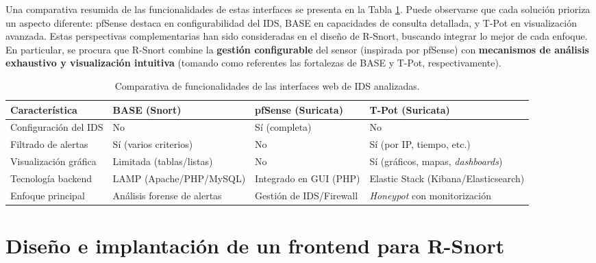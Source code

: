 \documentclass[11pt,a4paper,twoside]{report}
\begin{document}
\vspace{1em}
\noindent Una comparativa resumida de las funcionalidades de estas interfaces se presenta en la Tabla \ref{tab:comparativa-interfaces}. Puede observarse que cada solución prioriza un aspecto diferente: pfSense destaca en configurabilidad del IDS, BASE en capacidades de consulta detallada, y T-Pot en visualización avanzada. Estas perspectivas complementarias han sido consideradas en el diseño de R-Snort, buscando integrar lo mejor de cada enfoque. En particular, se procura que R-Snort combine la \textbf{gestión configurable} del sensor (inspirada por pfSense) con \textbf{mecanismos de análisis exhaustivo y visualización intuitiva} (tomando como referentes las fortalezas de BASE y T-Pot, respectivamente).

\begin{table}[hbtp]
	\centering
	\renewcommand{\arraystretch}{1.6}
	\setlength{\tabcolsep}{8pt} %
	\begin{tabularx}{\textwidth}{|>{\centering\arraybackslash}X 
			|>{\centering\arraybackslash}X 
			|>{\centering\arraybackslash}X 
			|>{\centering\arraybackslash}X|}
		\hline
		\textbf{Característica} & \textbf{BASE (Snort)} & \textbf{pfSense (Suricata)} & \textbf{T-Pot (Suricata)} \\
		\hline
		Configuración del IDS & No & Sí (completa) & No \\
		\hline
		Filtrado de alertas & Sí (varios criterios) & No & Sí (por IP, tiempo, etc.) \\
		\hline
		Visualización gráfica & Limitada (tablas/listas) & No & Sí (gráficos, mapas, \emph{dashboards}) \\
		\hline
		Tecnología backend & LAMP (Apache/PHP/MySQL) & Integrado en GUI (PHP) & Elastic Stack (Kibana/Elasticsearch) \\
		\hline
		Enfoque principal & Análisis forense de alertas & Gestión de IDS/Firewall & \emph{Honeypot} con monitorización \\
		\hline
	\end{tabularx}
	\caption{Comparativa de funcionalidades de las interfaces web de IDS analizadas.}
	\label{tab:comparativa-interfaces}
\end{table}

\clearpage
\null
\thispagestyle{empty}
\newpage
\chapter{Diseño e implantación de un frontend para R-Snort}
\end{document}
